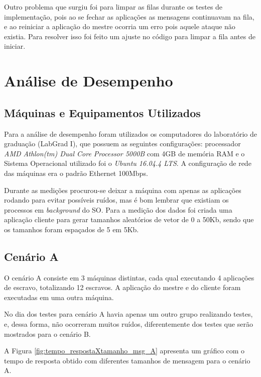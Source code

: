 \documentclass[
	12pt,				%
    oneside,			%
	a4paper,			%
	english,			%
	brazil,				%
	]{abntex2}
\begin{document}
Outro problema que surgiu foi para limpar as filas durante os testes de implementação, pois ao se fechar as aplicações as mensagens continuavam na fila, e ao reiniciar a aplicação do mestre ocorria um erro pois aquele ataque não existia. Para resolver isso foi feito um ajuste no código para limpar a fila antes de iniciar.


\chapter{Análise de Desempenho} 

\section{Máquinas e Equipamentos Utilizados}

Para a análise de desempenho foram utilizados os computadores do laboratório de graduação (LabGrad I), que possuem as seguintes configurações: processador \textit{AMD Athlon(tm) Dual Core Processor 5000B} com 4GB de memória RAM e o Sistema Operacional utilizado foi o \textit{Ubuntu 16.04.4 LTS}. A configuração de rede das máquinas era o padrão Ethernet 100Mbps. 

Durante as medições procurou-se deixar a máquina com apenas as aplicações rodando para evitar possíveis ruídos, mas é bom lembrar que existiam os processos em \textit{background} do SO. Para a medição dos dados foi criada uma aplicação cliente para gerar tamanhos aleatórios de vetor de 0 a 50Kb, sendo que os tamanhos foram espaçados de 5 em 5Kb.

\section{Cenário A}

O cenário A consiste em 3 máquinas distintas, cada qual executando 4 aplicações de escravo, totalizando 12 escravos. A aplicação do mestre e do cliente foram executadas em uma outra máquina. 

No dia dos testes para cenário A havia apenas um outro grupo realizando testes, e, dessa forma, não ocorreram muitos ruídos, diferentemente dos testes que serão mostrados para o cenário B.



A Figura \ref{fig:tempo_respostaXtamanho_msg_A} apresenta um gráfico com o tempo de resposta obtido com diferentes tamanhos de mensagem para o cenário A.
\end{document}
